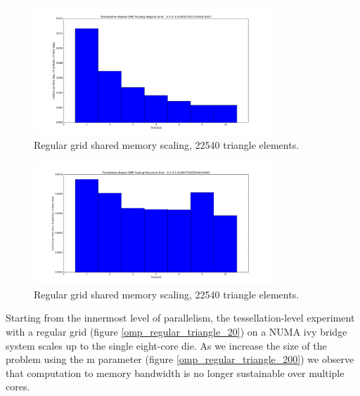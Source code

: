 \begin{figure}[htb]
  \begin{center}
    \includegraphics[width=0.8\textwidth]{experiments/omp/omp_mesh_regular_20.png}
  \end{center}
  \caption{Regular grid shared memory scaling, 22540 triangle elements.}
  \label{figure:omp_regular_triangle_20}
\end{figure}

\begin{figure}[htb]
  \begin{center}
    \includegraphics[width=0.8\textwidth]{experiments/omp/omp_mesh_reluctant_20.png}
  \end{center}
  \caption{Regular grid shared memory scaling, 22540 triangle elements.}
  \label{figure:omp_reluctant_triangle_20}
\end{figure}


Starting from the innermost level of parallelism, the tessellation-level experiment with a regular grid (figure \ref{omp_regular_triangle_20}) on a NUMA ivy bridge system scales up to the single eight-core die. As we increase the size of the problem using the m parameter (figure \ref{omp_regular_triangle_200}) we observe that computation to memory bandwidth is no longer sustainable over multiple cores. 


